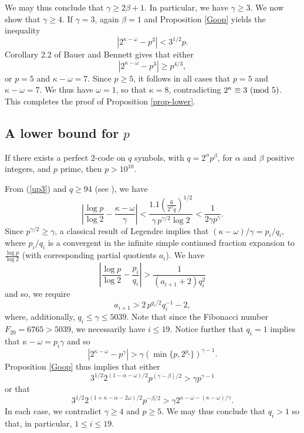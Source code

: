 \documentclass{amsart}
\def\mod#1{{\ifmmode\text{\rm\ (mod~$#1$)}
\else\discretionary{}{}{\hbox{ }}\rm(mod~$#1$)\fi}}
\begin{document}
{We may thus conclude that $\gamma \geq 2 \beta+1$. In particular, we have $\gamma \geq 3$.
 We now show that $\gamma \geq 4$. 
If $\gamma=3$, again $\beta=1$ and Proposition \ref{Goop} yields the inequality
$$
|2^{\kappa-\omega}-p^3| <  3^{1/2} p.
$$
Corollary 2.2 of Bauer and Bennett \cite{BaBe2} gives that either
$$
|2^{\kappa-\omega}-p^3| \geq p^{4/3},
$$
or $p =5$ and $\kappa-\omega=7$. Since $p \geq 5$, it follows in all cases that $p =5$ and $\kappa-\omega=7$. We thus have $\omega=1$, so that $\kappa=8$, contradicting $2^\kappa \equiv 3 \mod{5}$. This completes the proof of Proposition \ref{prop-lower}.

 \subsection{A lower bound for $p$}
 \begin{prop} \label{prop-lowerp}
 If there exists a perfect $2$-code on $q$ symbols, with $q=2^\alpha p^\beta$, for $\alpha$ and $\beta$  positive integers, and $p$ prime, then $p > 10^{10}$.
 \end{prop}
 
From (\ref{up3}) and $q \geq 94$ (see \cite{CG}), we have
\begin{equation} \label{snoopy!!}
\left|  \frac{\log p}{\log 2}- \frac{\kappa-\omega}{\gamma} \right| < \frac{1.1 \left( \frac{6}{2^\omega q} \right)^{1/2} }{\gamma \, p^{\gamma/2} \log 2}< \frac{1}{2 \gamma p^\gamma}.
\end{equation}
Since $p^{\gamma/2} \geq \gamma$, a classical result of Legendre implies that $(\kappa-\omega)/\gamma= p_i/q_i$, where $p_i/q_i$ is a convergent in the infinite simple continued fraction expansion to $\frac{\log p}{\log 2}$ (with corresponding partial quotients $a_i$). 
We have
\begin{equation} \label{snoopy2}
\left|  \frac{\log p}{\log 2}- \frac{p_i}{q_i} \right| > \frac{1}{(a_{i+1}+2) q_i^2}
\end{equation}
and so, we require
\begin{equation} \label{snoopy3}
a_{i+1} > 2 \, p^{q_i/2}  q_i^{-1}-2,
\end{equation}
where, additionally, $q_i \leq \gamma \leq 5039$. Note that since the Fibonacci number $F_{20}=6765>5039$, we necessarily have $i \leq 19$. Notice further that $q_i=1$ implies that $\kappa-\omega = p_i \gamma$ and so 
$$
\left| 2^{\kappa-\omega} - p^\gamma \right| > \gamma \left( \min \{ p, 2^{p_i} \} \right)^{\gamma-1}. 
$$
Proposition \ref{Goop} thus implies that either 
$$
3^{1/2} 2^{(1-\alpha-\omega)/2} p^{(\gamma-\beta)/2} > \gamma p^{\gamma-1}
$$
or that
$$
3^{1/2} 2^{(1+\kappa-\alpha-2\omega)/2} p^{-\beta/2} >  \gamma 2^{\kappa-\omega-(\kappa-\omega)/\gamma}.
$$
In each case, we contradict $\gamma \geq 4$ and $p \geq 5$.
 We may thus conclude that $q_i > 1$ so that, in particular, $1 \leq i \leq 19$. 


}
\end{document}

